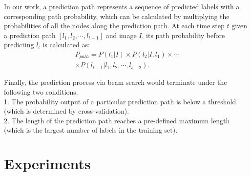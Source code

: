 \documentclass[letterpaper]{article} %
\begin{document}
In our work, a prediction path represents a sequence of predicted labels with a corresponding path probability, which can be calculated by multiplying the probabilities of all the nodes along the prediction path. At each time step $t$ given a prediction path $[l_1, l_2,\cdots, l_{t-1}]$ and image $I$, its path probability before predicting $l_t$ is calculated as:
\begin{equation}
\begin{aligned}
\label{eq:beam_search}
P_{path} = P(l_1|I) \times P(l_2|I, l_1) \times \cdots \\\times P(l_{t-1}|l_1, l_2, \cdots, l_{t-2}).
\end{aligned}
\end{equation}

Finally, the prediction process via beam search would terminate under the following two conditions:\\
1. The probability output of a particular prediction path is below a threshold (which is determined by cross-validation).\\
2. The length of the prediction path reaches a pre-defined maximum length (which is the largest number of labels in the training set).\\

\section{Experiments}
\end{document}
